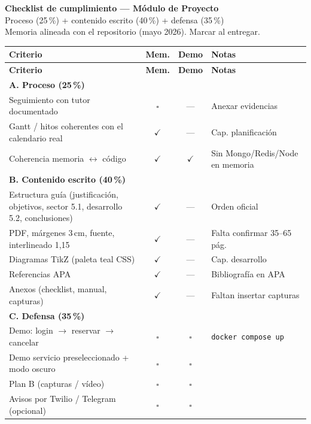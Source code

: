 \enlargethispage{2\baselineskip}
\begin{center}
  {\large\bfseries\color{tealdark} Checklist de cumplimiento --- Módulo de Proyecto}\\[0.3em]
  {\small Proceso (25\,\%) + contenido escrito (40\,\%) + defensa (35\,\%)}\\[0.2em]
  {\footnotesize Memoria alineada con el repositorio (mayo 2026). Marcar al entregar.}
\end{center}

\vspace{0.3em}
\scriptsize
\setlength{\tabcolsep}{3pt}
\renewcommand{\arraystretch}{1.12}

\begin{longtable}{@{}p{}ccp{}@{}}
\toprule
\textbf{Criterio} & \textbf{Mem.} & \textbf{Demo} & \textbf{Notas} \\
\midrule
\endfirsthead
\toprule
\textbf{Criterio} & \textbf{Mem.} & \textbf{Demo} & \textbf{Notas} \\
\midrule
\endhead

\multicolumn{4}{l}{\textbf{\color{tealdark}A. Proceso (25\,\%)}} \\
\midrule
Seguimiento con tutor documentado & $\square$ & --- & Anexar evidencias \\
Gantt / hitos coherentes con el calendario real & $\checkmark$ & --- & Cap. planificación \\
Coherencia memoria $\leftrightarrow$ código & $\checkmark$ & $\checkmark$ & Sin Mongo/Redis/Node en memoria \\
\midrule

\multicolumn{4}{l}{\textbf{\color{tealdark}B. Contenido escrito (40\,\%)}} \\
\midrule
Estructura guía (justificación, objetivos, sector 5.1, desarrollo 5.2, conclusiones) & $\checkmark$ & --- & Orden oficial \\
PDF, márgenes 3\,cm, fuente, interlineado 1,15 & $\checkmark$ & --- & Falta confirmar 35--65 pág. \\
Diagramas TikZ (paleta teal CSS) & $\checkmark$ & --- & Cap. desarrollo \\
Referencias APA & $\checkmark$ & --- & Bibliografía en APA \\
Anexos (checklist, manual, capturas) & $\checkmark$ & --- & Faltan insertar capturas \\
\midrule

\multicolumn{4}{l}{\textbf{\color{tealdark}C. Defensa (35\,\%)}} \\
\midrule
Demo: login $\rightarrow$ reservar $\rightarrow$ cancelar & $\square$ & $\square$ & \texttt{docker compose up} \\
Demo servicio preseleccionado + modo oscuro & $\square$ & $\square$ & \\
Plan B (capturas / vídeo) & $\square$ & $\square$ & \\
Avisos por Twilio / Telegram (opcional) & $\square$ & $\square$ & \\
\midrule


\end{longtable}
